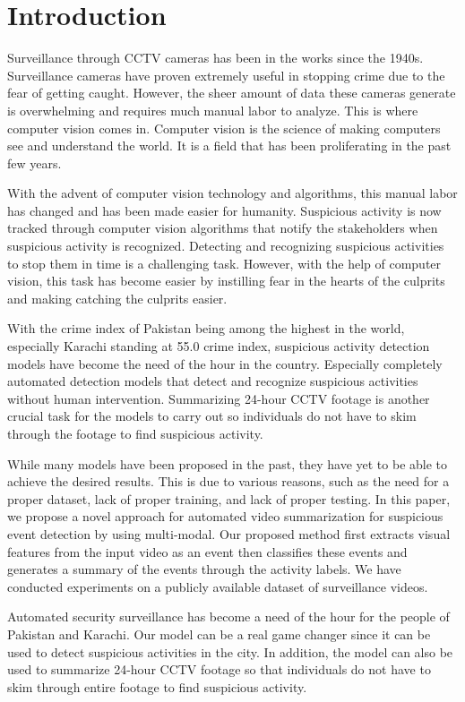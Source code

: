 \documentclass[conference]{IEEEtran}
\begin{document}
\section{Introduction}

Surveillance through CCTV cameras has been in the works since the 1940s. Surveillance cameras have proven extremely useful in stopping crime due to the fear of getting caught. However, the sheer amount of data these cameras generate is overwhelming and requires much manual labor to analyze. This is where computer vision comes in. Computer vision is the science of making computers see and understand the world. It is a field that has been proliferating in the past few years. 

With the advent of computer vision technology and algorithms, this manual labor has changed and has been made easier for humanity. Suspicious activity is now tracked through computer vision algorithms that notify the stakeholders when suspicious activity is recognized. Detecting and recognizing suspicious activities to stop them in time is a challenging task. However, with the help of computer vision, this task has become easier by instilling fear in the hearts of the culprits and making catching the culprits easier.

With the crime index of Pakistan being among the highest in the world, especially Karachi standing at 55.0 crime index, suspicious activity detection models have become the need of the hour in the country. Especially completely automated detection models that detect and recognize suspicious activities without human intervention. Summarizing 24-hour CCTV footage is another crucial task for the models to carry out so individuals do not have to skim through the footage to find suspicious activity.

While many models have been proposed in the past, they have yet to be able to achieve the desired results. This is due to various reasons, such as the need for a proper dataset, lack of proper training, and lack of proper testing. In this paper, we propose a novel approach for automated video summarization for suspicious event detection by using multi-modal. Our proposed method first extracts visual features from the input video as an event then classifies these events and generates a summary of the events through the activity labels. We have conducted experiments on a publicly available dataset of surveillance videos. 

Automated security surveillance has become a need of the hour for the people of Pakistan and Karachi. Our model can be a real game changer since it can be used to detect suspicious activities in the city. In addition, the model can also be used to summarize 24-hour CCTV footage so that individuals do not have to skim through entire footage to find suspicious activity.
\end{document}
